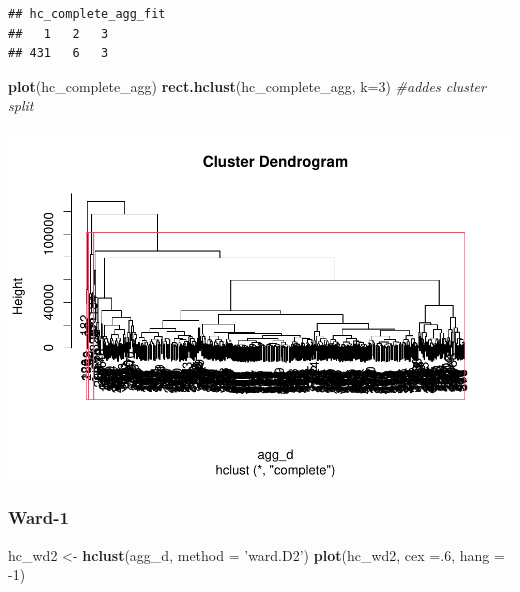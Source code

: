 \documentclass[
  english,
  man]{apa6}
\newenvironment{Shaded}{\begin{snugshade}}{\end{snugshade}}
\newcommand{\CommentTok}[1]{\textcolor[rgb]{0.56,0.35,0.01}{\textit{#1}}}
\newcommand{\DataTypeTok}[1]{\textcolor[rgb]{0.13,0.29,0.53}{#1}}
\newcommand{\DecValTok}[1]{\textcolor[rgb]{0.00,0.00,0.81}{#1}}
\newcommand{\KeywordTok}[1]{\textcolor[rgb]{0.13,0.29,0.53}{\textbf{#1}}}
\newcommand{\NormalTok}[1]{#1}
\newcommand{\StringTok}[1]{\textcolor[rgb]{0.31,0.60,0.02}{#1}}
\begin{document}
\begin{verbatim}
## hc_complete_agg_fit
##   1   2   3 
## 431   6   3
\end{verbatim}

\begin{Shaded}
\begin{Highlighting}[]
\KeywordTok{plot}\NormalTok{(hc_complete_agg)}
\KeywordTok{rect.hclust}\NormalTok{(hc_complete_agg, }\DataTypeTok{k=}\DecValTok{3}\NormalTok{) }\CommentTok{#addes cluster split}
\end{Highlighting}
\end{Shaded}

\includegraphics{MSDS680-Week-6-Kmeans-and-HCA_files/figure-latex/complete-2.pdf}

\hypertarget{ward-1}{%
\subsubsection{Ward-1}\label{ward-1}}

\begin{Shaded}
\begin{Highlighting}[]
\NormalTok{hc_wd2 <-}\StringTok{ }\KeywordTok{hclust}\NormalTok{(agg_d, }\DataTypeTok{method =} \StringTok{'ward.D2'}\NormalTok{)}
\KeywordTok{plot}\NormalTok{(hc_wd2, }\DataTypeTok{cex =}\NormalTok{.}\DecValTok{6}\NormalTok{, }\DataTypeTok{hang =} \DecValTok{-1}\NormalTok{)}
\end{Highlighting}
\end{Shaded}
\end{document}
